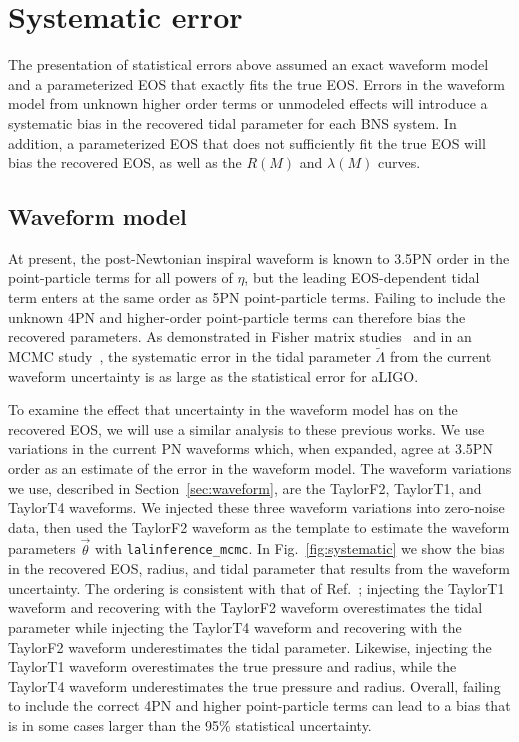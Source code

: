 \documentclass[twocolumn,prd,amssymb,aps,nofootinbib,showpacs,epsf]{revtex4}
\begin{document}
\section{Systematic error}
\label{sec:systematic}

The presentation of statistical errors above assumed an exact waveform model and a parameterized EOS that exactly fits the true EOS. Errors in the waveform model from unknown higher order terms or unmodeled effects will introduce a systematic bias in the recovered tidal parameter for each BNS system. In addition, a parameterized EOS that does not sufficiently fit the true EOS will bias the recovered EOS, as well as the $R(M)$ and $\lambda(M)$ curves.

\subsection{Waveform model}

At present, the post-Newtonian inspiral waveform is known to 3.5PN order in the point-particle terms for all powers of $\eta$, but the leading EOS-dependent tidal term enters at the same order as 5PN point-particle terms. Failing to include the unknown 4PN and higher-order point-particle terms can therefore bias the recovered parameters. As demonstrated in Fisher matrix studies~\cite{Favata2014, YagiYunes2014} and in an MCMC study~\cite{WadeCreightonOchsner2014}, the systematic error in the tidal parameter $\tilde\Lambda$ from the current waveform uncertainty is as large as the statistical error for aLIGO. 

To examine the effect that uncertainty in the waveform model has on the recovered EOS, we will use a similar analysis to these previous works. We use variations in the current PN waveforms which, when expanded, agree at 3.5PN order as an estimate of the error in the waveform model. The waveform variations we use, described in Section~\ref{sec:waveform}, are the TaylorF2, TaylorT1, and TaylorT4 waveforms. We injected these three waveform variations into zero-noise data, then used the TaylorF2 waveform as the template to estimate the waveform parameters $\vec\theta$ with \texttt{lalinference\_mcmc}. In Fig.~\ref{fig:systematic} we show the bias in the recovered EOS, radius, and tidal parameter that results from the waveform uncertainty. The ordering is consistent with that of Ref.~\cite{WadeCreightonOchsner2014}; injecting the TaylorT1 waveform and recovering with the TaylorF2 waveform overestimates the tidal parameter while injecting the TaylorT4 waveform and recovering with the TaylorF2 waveform underestimates the tidal parameter. Likewise, injecting the TaylorT1 waveform overestimates the true pressure and radius, while the TaylorT4 waveform underestimates the true pressure and radius. Overall, failing to include the correct 4PN and higher point-particle terms can lead to a bias that is in some cases larger than the 95\% statistical uncertainty.
\end{document}
